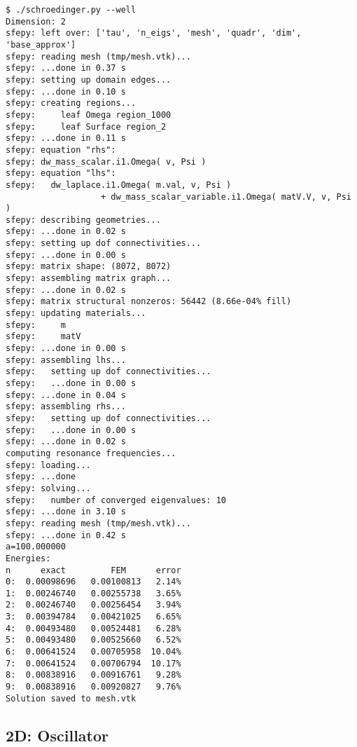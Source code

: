 \begin{lstlisting}
$ ./schroedinger.py --well
Dimension: 2
sfepy: left over: ['tau', 'n_eigs', 'mesh', 'quadr', 'dim', 'base_approx']
sfepy: reading mesh (tmp/mesh.vtk)...
sfepy: ...done in 0.37 s
sfepy: setting up domain edges...
sfepy: ...done in 0.10 s
sfepy: creating regions...
sfepy:     leaf Omega region_1000
sfepy:     leaf Surface region_2
sfepy: ...done in 0.11 s
sfepy: equation "rhs":
sfepy: dw_mass_scalar.i1.Omega( v, Psi )
sfepy: equation "lhs":
sfepy:   dw_laplace.i1.Omega( m.val, v, Psi )
                   + dw_mass_scalar_variable.i1.Omega( matV.V, v, Psi )
sfepy: describing geometries...
sfepy: ...done in 0.02 s
sfepy: setting up dof connectivities...
sfepy: ...done in 0.00 s
sfepy: matrix shape: (8072, 8072)
sfepy: assembling matrix graph...
sfepy: ...done in 0.02 s
sfepy: matrix structural nonzeros: 56442 (8.66e-04% fill)
sfepy: updating materials...
sfepy:     m
sfepy:     matV
sfepy: ...done in 0.00 s
sfepy: assembling lhs...
sfepy:   setting up dof connectivities...
sfepy:   ...done in 0.00 s
sfepy: ...done in 0.04 s
sfepy: assembling rhs...
sfepy:   setting up dof connectivities...
sfepy:   ...done in 0.00 s
sfepy: ...done in 0.02 s
computing resonance frequencies...
sfepy: loading...
sfepy: ...done
sfepy: solving...
sfepy:   number of converged eigenvalues: 10
sfepy: ...done in 3.10 s
sfepy: reading mesh (tmp/mesh.vtk)...
sfepy: ...done in 0.42 s
a=100.000000
Energies:
n      exact         FEM      error
0:  0.00098696   0.00100813   2.14%
1:  0.00246740   0.00255738   3.65%
2:  0.00246740   0.00256454   3.94%
3:  0.00394784   0.00421025   6.65%
4:  0.00493480   0.00524481   6.28%
5:  0.00493480   0.00525660   6.52%
6:  0.00641524   0.00705958  10.04%
7:  0.00641524   0.00706794  10.17%
8:  0.00838916   0.00916761   9.28%
9:  0.00838916   0.00920827   9.76%
Solution saved to mesh.vtk
\end{lstlisting}

\subsection{2D: Oscillator}

